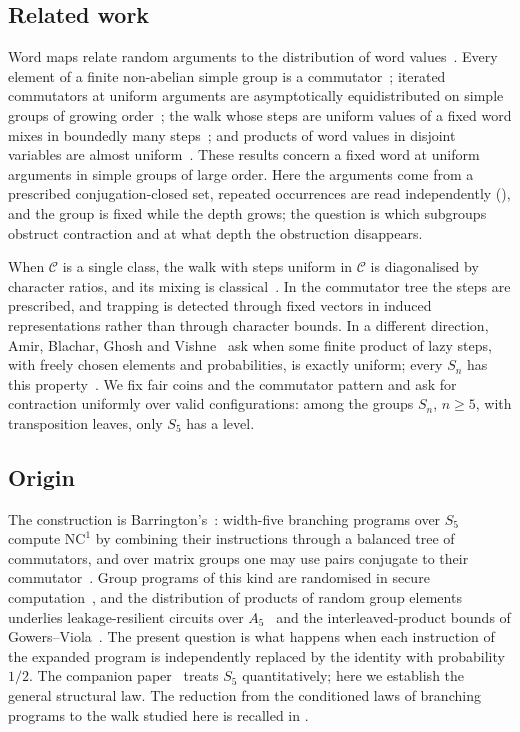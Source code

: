 \subsection*{Related work}
Word maps relate random arguments to the distribution of word
values~\cite{LarsenShalev,Shalev2013,BreuillardGlazer2025}. Every element
of a finite non-abelian simple group is a commutator~\cite{LOST2010};
iterated commutators at uniform arguments are asymptotically
equidistributed on simple groups of growing
order~\cite{GarionShalev2009}; the walk whose steps are uniform values of
a fixed word mixes in boundedly many steps~\cite{SchulShalev2011}; and
products of word values in disjoint variables are almost
uniform~\cite{LarsenShalevTiep2019}. These results concern a fixed word
at uniform arguments in simple groups of large order. Here the arguments
come from a prescribed conjugation-closed set, repeated occurrences are
read independently (), and the group is fixed while the
depth grows; the question is which subgroups obstruct contraction and at
what depth the obstruction disappears.

When $\mathcal C$ is a single class, the walk with steps uniform in
$\mathcal C$ is diagonalised by character ratios, and its mixing is
classical~\cite{DS81,Diaconis1988,Hildebrand1992,LulovPak,Roichman1996,
LiebeckShalev2005,Shalev2008}. In the commutator tree the steps are
prescribed, and trapping is detected through fixed vectors in induced
representations rather than through character bounds. In a different
direction, Amir, Blachar, Ghosh and Vishne~\cite{AmirMixability} ask
when some finite product of lazy steps, with freely chosen elements and
probabilities, is exactly uniform; every $S_n$ has this
property~\cite{AngelHolroyd2018}. We fix fair coins and the commutator
pattern and ask for contraction uniformly over valid configurations:
among the groups $S_n$, $n\ge5$, with transposition leaves, only $S_5$
has a level.

\subsection*{Origin}
The construction is Barrington's~\cite{Bar89}: width-five branching
programs over $S_5$ compute $\mathrm{NC}^1$ by combining their
instructions through a balanced tree of commutators, and over matrix
groups one may use pairs conjugate to their commutator~\cite{Boneh2013}. Group programs of
this kind are randomised in secure computation~\cite{Kilian1988}, and
the distribution of products of random group elements underlies
leakage-resilient circuits over $A_5$~\cite{MilesViola2013} and the
interleaved-product bounds of Gowers--Viola~\cite{GowersViola2019}. The
present question is what happens when each instruction of the expanded
program is independently replaced by the identity with probability
$1/2$. The companion paper~\cite{ZermenoS5} treats $S_5$ quantitatively;
here we establish the general structural law. The reduction from the
conditioned laws of branching programs to the walk studied here is
recalled in .

